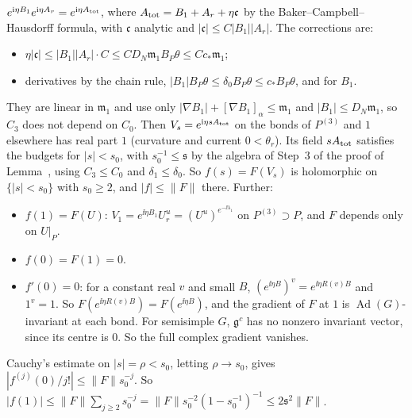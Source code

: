 \begin{detail}
\begin{step}
$e^{\mathrm i\eta B_1}e^{\mathrm i\eta A_r}=e^{\mathrm i\eta A_{\rm tot}}$, where $A_{\rm tot}=B_1+A_r+\eta\mathfrak c$ by the Baker--Campbell--Hausdorff formula, with $\mathfrak c$ analytic and $|\mathfrak c|\le C|B_1||A_r|$. The corrections are:
\begin{itemize}
\item $\eta|\mathfrak c|\le|B_1||A_r|\cdot C\le CD_N\mathfrak m_1B_P\theta\le Cc_*\mathfrak m_1$;
\item derivatives by the chain rule, $|B_1|B_P\theta\le\delta_0B_P\theta\le c_*B_P\theta$, and  for $B_1$.
\end{itemize}
They are linear in $\mathfrak m_1$ and use only $|\nabla B_1|+[\nabla B_1]_\alpha\le\mathfrak m_1$ and $|B_1|\le D_N\mathfrak m_1$, so $C_3$ does not depend on $C_0$. Then $V_s=e^{\mathrm i\eta sA_{\rm tot}}$ on the bonds of $P^{(3)}$ and $1$ elsewhere has real part $1$ (curvature and current $0<\theta_r$). Its field $sA_{\rm tot}$ satisfies the budgets for $|s|<s_0$, with $s_0^{-1}\le\mathfrak s$ by the algebra of Step~3 of the proof of Lemma~, using $C_3\le C_0$ and $\delta_1\le\delta_0$. So $f(s)=F(V_s)$ is holomorphic on $\{|s|<s_0\}$ with $s_0\ge2$, and $|f|\le\|F\|$ there. Further:
\begin{itemize}
\item $f(1)=F(U)$: $V_1=e^{\ii\eta B_1}U_r^u=(U^u)^{e^{-\ii\lambda_1}}$ on $P^{(3)}\supset P$, and $F$ depends only on $U|_P$.
\item $f(0)=F(1)=0$.
\item $f'(0)=0$: for a constant real $v$ and small $B$, $(e^{\ii\eta B})^v=e^{\ii\eta R(v)B}$ and $1^v=1$. So $F(e^{\ii\eta R(v)B})=F(e^{\ii\eta B})$, and the gradient of $F$ at $1$ is $\operatorname{Ad}(G)$-invariant at each bond. For semisimple $G$, $\mathfrak g^c$ has no nonzero invariant vector, since its centre is $0$. So the full complex gradient vanishes.
\end{itemize}
Cauchy's estimate on $|s|=\rho<s_0$, letting $\rho\to s_0$, gives $|f^{(j)}(0)/j!|\le\|F\|s_0^{-j}$. So $|f(1)|\le\|F\|\sum_{j\ge2}s_0^{-j}=\|F\|s_0^{-2}(1-s_0^{-1})^{-1}\le2\mathfrak s^2\|F\|$.
\end{step}
\end{detail}

